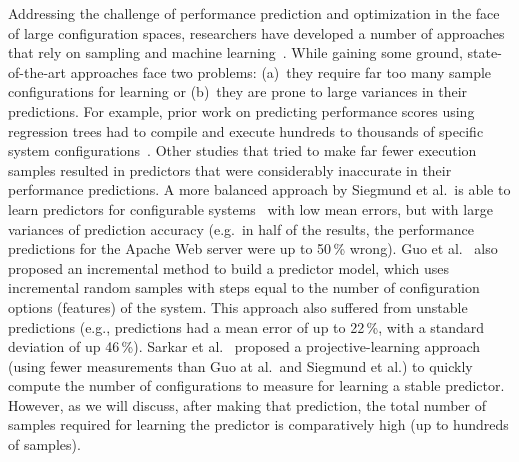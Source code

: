 \documentclass{sig-alternative}
\begin{document}
Addressing the challenge of performance prediction and optimization in the face of large configuration spaces, researchers have developed a number of approaches that rely on sampling and machine learning~\cite{siegmund2012predicting,guo2013variability,sarkar2015cost}. While gaining some ground, state-of-the-art approaches face two problems: 
(a)~they require far too many sample configurations for learning or (b)~they are prone to large variances in their predictions. For example, prior work on predicting performance scores using regression trees had to compile and execute hundreds to thousands of specific system configurations~\cite{guo2013variability}. 
Other studies that tried to make far fewer execution samples resulted in predictors that were considerably inaccurate in their performance predictions.
A more balanced approach by Siegmund et al.\ is able to learn predictors for  configurable systems~\cite{siegmund2012predicting} with low mean errors, but with large variances of prediction accuracy  (e.g.\ in half of the results, the performance predictions for the Apache Web server were up to 50\,\% wrong). 
Guo et al.~\cite{guo2013variability} also proposed an incremental method to build a predictor model, which uses incremental random samples with steps equal to the number of configuration options (features) of the system. This approach also
suffered from  unstable predictions (e.g., predictions had a mean error of up to 22\,\%, with a standard deviation of up 46\,\%). Sarkar et al.~\cite{sarkar2015cost} proposed a proj\-ective-learning approach (using fewer measurements than Guo at al.\ and Siegmund et al.) to quickly compute  the number of configurations to measure for learning a stable predictor. However, as we will discuss, after making that prediction, the total number of samples required for learning the predictor is comparatively high (up to hundreds of samples).
\end{document}

